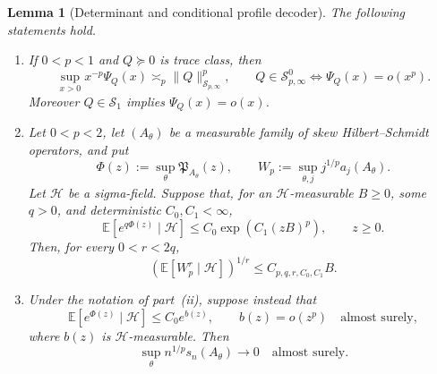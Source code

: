 \documentclass[10pt,reqno]{amsart}
\theoremstyle{plain}
\newtheorem{lemma}[theorem]{Lemma}
\theoremstyle{definition}
\theoremstyle{remark}
\begin{document}
\begin{lemma}[Determinant and conditional profile decoder]
\label{cc:lem-response-profile-decoder}
The following statements hold.
\begin{enumerate}[label=\textup{(\roman*)},leftmargin=2.8em]
\item If \(0<p<1\) and \(Q\succeq0\) is trace class, then
\begin{equation}
 \sup_{x>0}x^{-p}\Psi_Q(x)
 \asymp_p\|Q\|_{\mathcal S_{p,\infty}}^p,
 \qquad
 Q\in\mathcal S^0_{p,\infty}
 \Longleftrightarrow \Psi_Q(x)=o(x^p).
 \label{cc:eq-determinant-weak-dictionary}
\end{equation}
Moreover \(Q\in\mathcal S_1\) implies \(\Psi_Q(x)=o(x)\).

\item Let \(0<p<2\), let \((A_\theta)\) be a measurable family of skew
Hilbert--Schmidt operators, and put
\[
 \Phi(z):=\sup_\theta\mathfrak P_{A_\theta}(z),
 \qquad
 W_p:=\sup_{\theta,j}j^{1/p}a_j(A_\theta).
\]
Let \(\mathcal H\) be a sigma-field.  Suppose that, for an
\(\mathcal H\)-measurable \(B\geq0\), some \(q>0\), and deterministic
\(C_0,C_1<\infty\),
\begin{equation}
 \mathbb E[e^{q\Phi(z)}\mid\mathcal H]
 \leq C_0\exp(C_1(zB)^p),\qquad z\geq0.
 \label{cc:eq-maximal-profile-hypothesis}
\end{equation}
Then, for every \(0<r<2q\),
\begin{equation}
 \left(\mathbb E[W_p^r\mid\mathcal H]\right)^{1/r}
 \leq C_{p,q,r,C_0,C_1}B.
 \label{cc:eq-maximal-profile-moment}
\end{equation}

\item Under the notation of part~\textup{(ii)}, suppose instead that
\begin{equation}
 \mathbb E[e^{\Phi(z)}\mid\mathcal H]
 \leq C_0e^{b(z)},
 \qquad b(z)=o(z^p)\quad\text{almost surely},
 \label{cc:eq-maximal-profile-little-hypothesis}
\end{equation}
where \(b(z)\) is \(\mathcal H\)-measurable.  Then
\begin{equation}
 \sup_\theta n^{1/p}s_n(A_\theta)\longrightarrow0
 \quad\text{almost surely}.
 \label{cc:eq-maximal-profile-little-conclusion}
\end{equation}
\end{enumerate}
\end{lemma}
\end{document}
